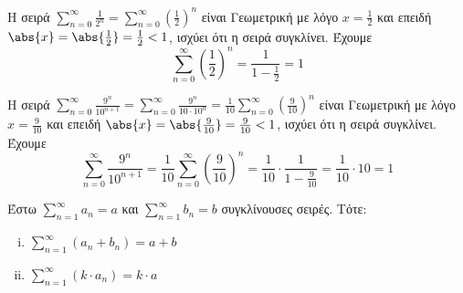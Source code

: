 \documentclass[main.tex]{subfiles}
\begin{document}
\begin{examples}
\item Η σειρά $ \sum_{n=0}^{\infty} \frac{1}{2^{n}} = \sum_{n=0}^{\infty} 
    {\left(\frac{1}{2} \right)}^{n} $ είναι Γεωμετρική με λόγο $ x = \frac{1}{2} $ 
    και επειδή 
    $ \abs{x} = \abs{\frac{1}{2}} = \frac{1}{2} < 1  $, ισχύει ότι η σειρά συγκλίνει.
    Έχουμε
    \[
        \sum_{n=0}^{\infty} {\left(\frac{1}{2} \right)}^{n} = 
        \frac{1}{1 - \frac{1}{2}} = 1
    \] 

\item Η σειρά $ \sum_{n=0}^{\infty} \frac{9^{n}}{10^{n+1}} = 
    \sum_{n=0}^{\infty} \frac{9^{n}}{10 \cdot 10^{n}} = 
    \frac{1}{10} \sum_{n=0}^{\infty} {\left(\frac{9}{10} \right)}^{n} $ είναι
    Γεωμετρική με λόγο $ x = \frac{9}{10} $ και επειδή $ \abs{x} = 
    \abs{\frac{9}{10}} = \frac{9}{10} < 1$, ισχύει ότι η σειρά συγκλίνει.
    Έχουμε 
    \[
        \sum_{n=0}^{\infty}  \frac{9^{n}}{10^{n+1}} = 
        \frac{1}{10} \sum_{n=0}^{\infty} {\left(\frac{9}{10} \right)}^{n} = 
        \frac{1}{10} \cdot \frac{1}{1 - \frac{9}{10}} = \frac{1}{10} \cdot 10 = 1
    \]
\end{examples}

\begin{prop}
    Έστω $ \sum_{n=1}^{\infty} a_{n} = a $ και $ \sum_{n=1}^{\infty} b_{n} = b $ 
    συγκλίνουσες σειρές. Τότε:
    \begin{enumerate}[i)]
        \item $ \sum_{n=1}^{\infty} (a_{n}+b_{n}) = a+b $
        \item $ \sum_{n=1}^{\infty} (k\cdot a_{n}) = k\cdot a $ 
    \end{enumerate}
\end{prop}
\end{document}
